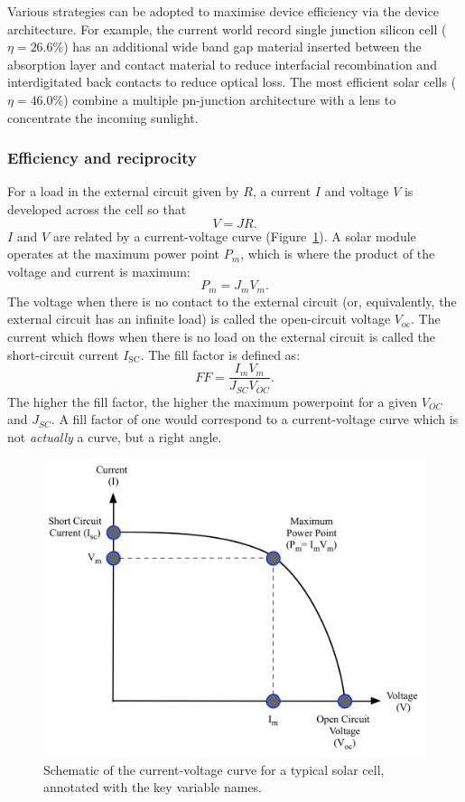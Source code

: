 Various strategies can be adopted to maximise device efficiency via the device architecture. For example, the current world record single junction silicon cell ($\eta=26.6\%$) has an additional wide band gap material inserted between the absorption layer and contact material to reduce interfacial recombination and interdigitated back contacts to reduce optical loss.\autocite{Yoshikawa2017} The most efficient solar cells ($\eta=46.0\%$) combine a multiple pn-junction architecture with a lens to concentrate the incoming sunlight.

\subsubsection{Efficiency and reciprocity}
For a load in the external circuit given by $R$, a current $I$ and voltage $V$ is developed across the cell so that
$$ V = JR. $$
$I$ and $V$ are related by a current-voltage curve (Figure\ \ref{current_voltage}).
A solar module operates at the maximum power point $P_m$, which is where the product of the voltage and current is maximum:
$$ P_m  = J_m V_m. $$
The voltage when there is no contact to the external circuit (or, equivalently, the external circuit has an infinite load) is called the open-circuit voltage $V_{\text{oc}}$. The current which flows when there is no load on the external circuit is called the short-circuit current $I_{\text{SC}}$.
The fill factor is defined as:
$$ FF = \frac{I_mV_m}{J_{SC} V_{OC}}.$$
The higher the fill factor, the higher the maximum powerpoint for a given $V_{OC}$ and $J_{SC}$.\autocite{Nelson2003} A fill factor of one would correspond to a current-voltage curve which is not \textit{actually} a curve, but a right angle.

 \begin{figure}[h]
 \centering
   \includegraphics[width=0.65\columnwidth]{figures/ch1/current-voltage.png}
   \caption[Solar cell current-voltage curve]{Schematic of the current-voltage curve for a typical solar cell, annotated with the key variable names.}
   \label{current_voltage}
 \end{figure}

